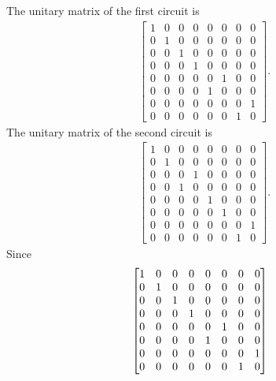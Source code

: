 \documentclass[en]{sol-man}
\begin{document}
\begin{sol}
\begin{itemize}
        \begin{pf}
            The unitary matrix of the first circuit is
            \begin{align}
                \begin{bmatrix}
                    1&0&0&0&0&0&0&0\\
                    0&1&0&0&0&0&0&0\\
                    0&0&1&0&0&0&0&0\\
                    0&0&0&1&0&0&0&0\\
                    0&0&0&0&0&1&0&0\\
                    0&0&0&0&1&0&0&0\\
                    0&0&0&0&0&0&0&1\\
                    0&0&0&0&0&0&1&0
                \end{bmatrix}.
            \end{align}
            The unitary matrix of the second circuit is
            \begin{align}
                \begin{bmatrix}
                    1&0&0&0&0&0&0&0\\
                    0&1&0&0&0&0&0&0\\
                    0&0&0&1&0&0&0&0\\
                    0&0&1&0&0&0&0&0\\
                    0&0&0&0&1&0&0&0\\
                    0&0&0&0&0&1&0&0\\
                    0&0&0&0&0&0&0&1\\
                    0&0&0&0&0&0&1&0
                \end{bmatrix}.
            \end{align}
            Since
            \begin{align}
                \notag&\begin{bmatrix}
                    1&0&0&0&0&0&0&0\\
                    0&1&0&0&0&0&0&0\\
                    0&0&1&0&0&0&0&0\\
                    0&0&0&1&0&0&0&0\\
                    0&0&0&0&0&1&0&0\\
                    0&0&0&0&1&0&0&0\\
                    0&0&0&0&0&0&0&1\\
                    0&0&0&0&0&0&1&0

\end{bmatrix}
\end{align}
\end{pf}
\end{itemize}
\end{sol}
\end{document}
